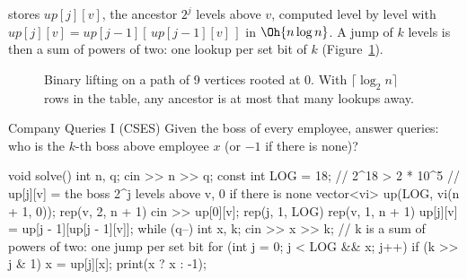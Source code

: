  stores $\mathit{up}[j][v]$, the ancestor $2^j$ levels above $v$, computed level by level with
$\mathit{up}[j][v] = \mathit{up}[j-1][\,\mathit{up}[j-1][v]\,]$ in $\Oh{n \log n}$. A jump of $k$ levels is then a sum of powers of
two: one lookup per set bit of $k$ (Figure~\ref{fig:lifting}).

\begin{figure}[htbp]
\centering
{}
\caption{Binary lifting on a path of 9 vertices rooted at 0. With $\lceil \log_2 n \rceil$ rows in the table, any ancestor is at
most that many lookups away.}
\label{fig:lifting}
\end{figure}

\begin{problem}{Company Queries I (CSES)}
Given the boss of every employee, answer queries: who is the $k$-th boss above employee $x$ (or $-1$ if there is none)?
\end{problem}

\begin{code}
void solve() {
    int n, q;
    cin >> n >> q;
    const int LOG = 18;  // 2^18 > 2 * 10^5
    // up[j][v] = the boss 2^j levels above v, 0 if there is none
    vector<vi> up(LOG, vi(n + 1, 0));
    rep(v, 2, n + 1) cin >> up[0][v];
    rep(j, 1, LOG) rep(v, 1, n + 1) up[j][v] = up[j - 1][up[j - 1][v]];
    while (q--) {
        int x, k;
        cin >> x >> k;
        // k is a sum of powers of two: one jump per set bit
        for (int j = 0; j < LOG && x; j++)
            if (k >> j & 1) x = up[j][x];
        print(x ? x : -1);
    }
}
\end{code}

